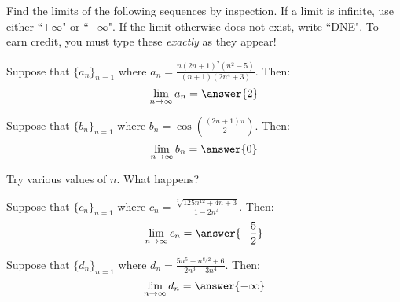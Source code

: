 \documentclass{ximera}
\author{Jim Talamo}
\begin{document}
\begin{exercise}

Find the limits of the following sequences by inspection.  If a limit is infinite, use either ``$+\infty$" or ``$-\infty$".  If the limit otherwise does not exist, write ``DNE".  To earn credit, you must type these \emph{exactly} as they appear!

\begin{exercise}
Suppose that $\{a_n \}_{n=1}$ where $a_n = \frac{n(2n+1)^2(n^2-5)}{(n+1)(2n^4+3)}$.  Then:
\[
\lim_{n \to \infty} a_n = \answer{2}
\]
\end{exercise}

\begin{exercise}
Suppose that $\{b_n \}_{n=1}$ where $b_n = \cos \left(\frac{(2n+1)\pi}{2}\right)$.  Then:
\[
\lim_{n \to \infty} b_n = \answer{0}
\]

\begin{hint}
Try various values of $n$.  What happens?
\end{hint}
\end{exercise}

\begin{exercise}
Suppose that $\{c_n \}_{n=1}$ where $c_n = \frac{\sqrt[3]{125n^{12}+4n+3}}{1-2n^4}$.  Then:
\[
\lim_{n \to \infty} c_n = \answer{-\frac{5}{2}}
\]
\end{exercise}

\begin{exercise}
Suppose that $\{d_n \}_{n=1}$ where $d_n = \frac{5n^5+n^{8/2}+6}{2n^3-3n^4}$.  Then:
\[
\lim_{n \to \infty} d_n =  \answer{-\infty}
\]
\end{exercise}


\end{exercise}
\end{document}
